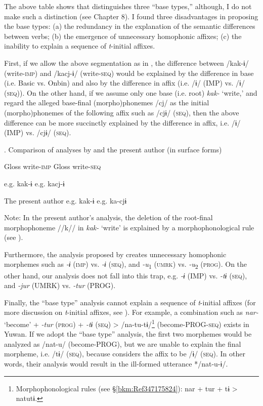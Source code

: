 The above table shows that \citet{UchimaEtAl1976} distinguishes three “base types,” although, I do not make such a distinction (see Chapter 8). I found three disadvantages in proposing the base types: (a) the redundancy in the explanation of the semantic differences between verbs; (b) the emergence of unnecessary homophonic affixes; (c) the inability to explain a sequence of \textit{t}{}-initial affixes.

First, if we allow the above segmentation as in , the difference between /kak-ɨ/ (write-\textsc{imp}) and /kacj-ɨ/ (write-\textsc{seq}) would be explained by the difference in base (i.e. Basic vs. Onbin) and also by the difference in affix (i.e. /ɨ/ (IMP) vs. /ɨ/ (\textsc{seq})). On the other hand, if we assume only one base (i.e. root) \textit{kak-} ‘write,’ and regard the alleged base-final (morpho)phonemes /cj/ as the initial (morpho)phonemes of the following affix such as /cjɨ/ (\textsc{seq}), then the above difference can be more succinctly explained by the difference in affix, i.e. /ɨ/ (IMP) vs. /cjɨ/ (\textsc{seq}).

\begin{table}
\caption{\label{tab:key:69}. Comparison of analyses by \citet{UchimaEtAl1976} and the present author (in surface forms)}

  Gloss  write-\textsc{imp}    Gloss  write-\textsc{seq}

\citet{UchimaEtAl1976}  e.g.  kak-ɨ    e.g.  kacj-ɨ

The present author  e.g.  kak-ɨ    e.g.  ka-cjɨ

Note: In the present author’s analysis, the deletion of the root-final morphophoneme //k// in \textit{kak-} ‘write’ is explained by a morphophonological rule (see ).
\end{table}

  Furthermore, the analysis proposed by \citet{UchimaEtAl1976} creates unnecessary homophonic morphemes such as \textit{{}-ɨ} (\textsc{imp}) vs. \textit{{}-ɨ} (\textsc{seq}), and \textit{{}-u}\textsubscript{1} (\textsc{umrk}) vs. \textit{{}-u}\textsubscript{2} (\textsc{prog}). On the other hand, our analysis does not fall into this trap, e.g. \textit{{}-ɨ} (IMP) vs. \textit{{}-tɨ} (\textsc{seq}), and \textit{{}-jur} (UMRK) vs. \textit{{}-tur} (PROG).

  Finally, the “base type” analysis cannot explain a sequence of \textit{t}{}-initial affixes (for more discussion on \textit{t}{}-initial affixes, see ). For example, a combination such as \textit{nar-} ‘become’ + \textit{-tur} (\textsc{prog}) + \textit{{}-tɨ} (\textsc{seq}) > /na-tu-tɨ/\footnote{Morphophonological rules (see §\ref{bkm:Ref347175824}): nar + tur + tɨ > natutɨ.} (become-PROG-\textsc{seq}) exists in Yuwan. If we adopt the “base type” analysis, the first two morphemes would be analyzed as /nat-u/ (become-PROG), but we are unable to explain the final morpheme, i.e. /tɨ/ (\textsc{seq}), because \citet[91-92]{UchimaEtAl1976} considers the affix to be /ɨ/ (\textsc{seq}). In other words, their analysis would result in the ill-formed utterance */nat-u-ɨ/.

